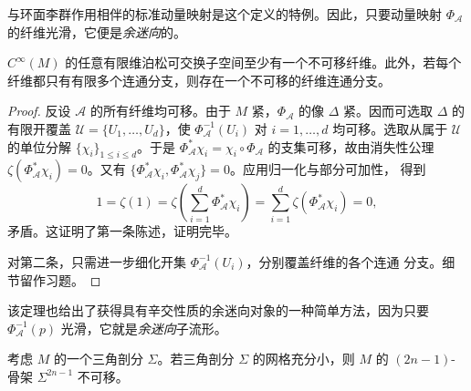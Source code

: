 与环面李群作用相伴的标准动量映射是这个定义的特例。因此，只要动量映射
$\Phi_{\mathcal A}$ 的纤维光滑，它便是\emph{余迷向}的。

\begin{theorem}
\label{thm:22-nondisplaceable-fiber}
$C^\infty(M)$ 的任意有限维泊松可交换子空间至少有一个不可移纤维。此外，若每个
纤维都只有有限多个连通分支，则存在一个不可移的纤维连通分支。
\end{theorem}

\begin{proof}
反设 $\mathcal A$ 的所有纤维均可移。由于 $M$ 紧，$\Phi_{\mathcal A}$ 的像
$\Delta$ 紧。因而可选取 $\Delta$ 的有限开覆盖
$\mathcal U=\{U_1,\ldots,U_d\}$，使 $\Phi_{\mathcal A}^{-1}(U_i)$ 对
$i=1,\ldots,d$ 均可移。选取从属于 $\mathcal U$ 的单位分解
$\{\chi_i\}_{1\leq i\leq d}$。于是
$\Phi_{\mathcal A}^*\chi_i=\chi_i\circ\Phi_{\mathcal A}$ 的支集可移，故由消失性公理
$\zeta(\Phi_{\mathcal A}^*\chi_i)=0$。又有
$\{\Phi_{\mathcal A}^*\chi_i,\Phi_{\mathcal A}^*\chi_j\}=0$。应用归一化与部分可加性，
得到
\[
 1=\zeta(1)=\zeta\!\left(\sum_{i=1}^d\Phi_{\mathcal A}^*\chi_i\right)
 =\sum_{i=1}^d\zeta(\Phi_{\mathcal A}^*\chi_i)=0,
\]
矛盾。这证明了第一条陈述，证明完毕。

对第二条，只需进一步细化开集 $\Phi_{\mathcal A}^{-1}(U_i)$，分别覆盖纤维的各个连通
分支。细节留作习题。
\end{proof}

该定理也给出了获得具有辛交性质的余迷向对象的一种简单方法，因为只要
$\Phi_{\mathcal A}^{-1}(p)$ 光滑，它就是\emph{余迷向}子流形。

\begin{theorem}
\label{thm:22-nondisplaceable-skeleton}
考虑 $M$ 的一个三角剖分 $\Sigma$。若三角剖分 $\Sigma$ 的网格充分小，则 $M$ 的
$(2n-1)$-骨架 $\Sigma^{2n-1}$ 不可移。
\end{theorem}

